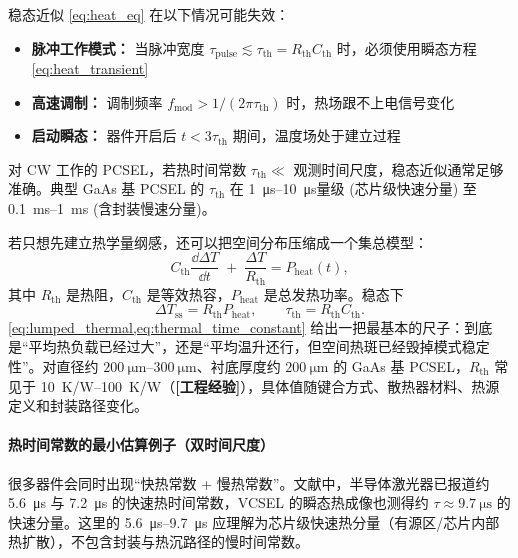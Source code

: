 \begin{WarningBox}[瞬态热效应的适用条件]
稳态近似 \cref{eq:heat_eq} 在以下情况可能失效：
\begin{itemize}
  \item \textbf{脉冲工作模式：} 当脉冲宽度 $\tau_{\mathrm{pulse}} \lesssim \tau_{\mathrm{th}} = R_{\mathrm{th}}C_{\mathrm{th}}$ 时，必须使用瞬态方程\ref{eq:heat_transient}
  \item \textbf{高速调制：} 调制频率 $f_{\mathrm{mod}} > 1/(2\pi\tau_{\mathrm{th}})$ 时，热场跟不上电信号变化
  \item \textbf{启动瞬态：} 器件开启后 $t < 3\tau_{\mathrm{th}}$ 期间，温度场处于建立过程
\end{itemize}
对 CW 工作的 PCSEL，若热时间常数 $\tau_{\mathrm{th}} \ll$ 观测时间尺度，稳态近似通常足够准确。典型 GaAs 基 PCSEL 的 $\tau_{\mathrm{th}}$ 在 \SIrange{1}{10}{\micro\second}量级 (芯片级快速分量) 至 \SIrange{0.1}{1}{ms} (含封装慢速分量)。
\end{WarningBox}

若只想先建立热学量纲感，还可以把空间分布压缩成一个集总模型：
\begin{equation}
C_{\mathrm{th}}\frac{\dd \Delta T}{\dd t}
\;+\;
\frac{\Delta T}{R_{\mathrm{th}}}
=
P_{\mathrm{heat}}(t),
\label{eq:lumped_thermal}
\end{equation}
其中 $R_{\mathrm{th}}$ 是热阻，$C_{\mathrm{th}}$ 是等效热容，$P_{\mathrm{heat}}$ 是总发热功率。稳态下
\begin{equation}
\Delta T_{\mathrm{ss}} = R_{\mathrm{th}} P_{\mathrm{heat}},
\qquad
\tau_{\mathrm{th}} = R_{\mathrm{th}}C_{\mathrm{th}}.
\label{eq:thermal_time_constant}
\end{equation}
\cref{eq:lumped_thermal,eq:thermal_time_constant} 给出一把最基本的尺子：到底是“平均热负载已经过大”，还是“平均温升还行，但空间热斑已经毁掉模式稳定性”。对直径约 $\SIrange{200}{300}{\micro\meter}$、衬底厚度约 $\SI{200}{\micro\meter}$ 的 GaAs 基 PCSEL，$R_{\mathrm{th}}$ 常见于 \SIrange{10}{100}{K/W}（\textbf{[工程经验]}），具体值随键合方式、散热器材料、热源定义和封装路径变化。

\paragraph{热时间常数的最小估算例子（双时间尺度）}很多器件会同时出现“快热常数 + 慢热常数”。文献中，半导体激光器已报道约 \SI{5.6}{\micro\second} 与 \SI{7.2}{\micro\second} 的快速热时间常数\cite{esman1986thermal}，VCSEL 的瞬态热成像也测得约 $\tau\approx\SI{9.7}{\micro\second}$ 的快速分量\cite{garcia2016vcselthermal}。这里的 \SIrange{5.6}{9.7}{\micro\second} 应理解为芯片级快速热分量（有源区/芯片内部热扩散），不包含封装与热沉路径的慢时间常数。

